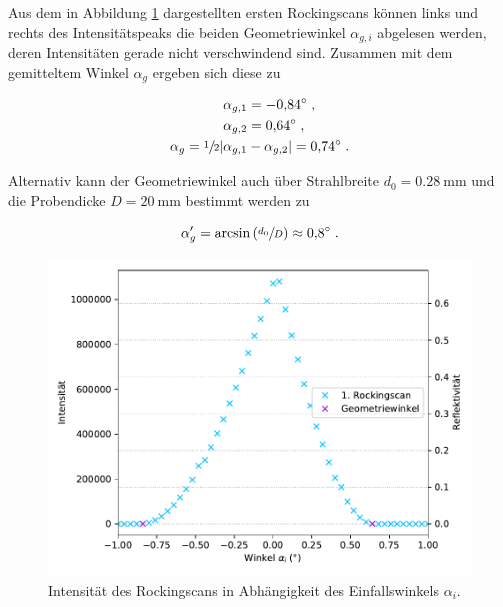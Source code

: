 Aus dem in Abbildung \ref{fig:plot3} dargestellten ersten Rockingscans
können links und rechts des Intensitätspeaks die beiden Geometriewinkel $\alpha_{g,i}$
abgelesen werden, deren Intensitäten gerade nicht verschwindend sind. 
Zusammen mit dem gemitteltem Winkel $\alpha_g$ ergeben sich diese zu

\vspace{-25pt}
\begin{align*}
    \alpha_{g,1} &= \SI{-0.84}{\degree} \; , \\
    \alpha_{g,2} &= \SI{0.64}{\degree} \; , \\
    \alpha_{g} = \sfrac{1}{2}|\alpha_{g,1} &- \alpha_{g,2}| = \SI{0.74}{\degree} \; .
\end{align*}

Alternativ kann der Geometriewinkel auch über Strahlbreite $d_0 = \SI{0.28}{\milli\meter}$ und 
die Probendicke $D = \SI{20}{\milli\meter}$ bestimmt werden zu

\begin{equation}
    \alpha'_g = \text{arcsin} \left(\sfrac{d_0}{D}\right) \approx \SI{0.8}{\degree}  \; .
\end{equation}

\vspace{-5pt}
\begin{figure}
    \centering
    \includegraphics[scale=0.7]{content/plot3.pdf}
    \vspace{-10pt}
    \caption{Intensität des Rockingscans in Abhängigkeit des Einfallswinkels $\alpha_i$.}
    \label{fig:plot3}
\end{figure}
\vspace{-5pt}

